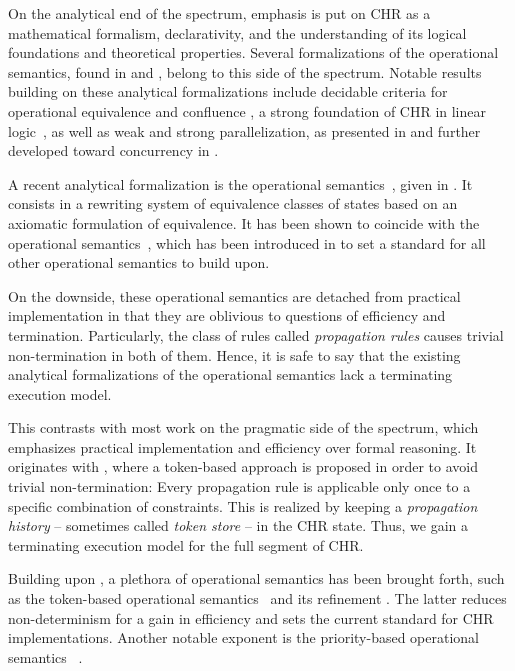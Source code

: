 \documentclass{tlp}
\begin{document}
On the analytical end of the spectrum, emphasis is put on CHR as a mathematical
formalism, declarativity, and the understanding of its logical foundations and
theoretical properties. Several formalizations of the operational semantics,
found in \cite{Fruhwirth1993,fruehwirth98} and \cite{fruehwirthabdennadher03},
belong to this side of the spectrum. Notable results building on these analytical
formalizations include decidable criteria for operational equivalence
\cite{abdennadherfruehwirth99} and confluence
\cite{abdennadherfruehwirthmeuss99}, a strong foundation of CHR in linear
logic~\cite{betzfruehwirth05}, as well as weak and strong parallelization, as
presented in \cite{fruehwirth05} and further developed toward concurrency in
\cite{Sulzmann2007,Sulzmann2008}.

A recent analytical formalization is the operational semantics~, given
in \cite{Raiser2009a}. It consists in a rewriting system of equivalence classes
of states based on an axiomatic formulation of equivalence. It has been shown to
coincide with the operational semantics~, which has been introduced
in \cite{fruehwirth09} to set a standard for all other operational semantics to
build upon.

On the downside, these operational semantics are detached from practical
implementation in that they are oblivious to questions of efficiency and
termination. Particularly, the class of rules called \emph{propagation rules}
causes trivial non-termination in both of them. Hence, it is safe to say that
the existing analytical formalizations of the operational semantics lack a 
terminating execution model.

This contrasts with most work on the pragmatic side of the spectrum, which
emphasizes practical implementation and efficiency over formal reasoning. It
originates with \cite{abdennadher97}, where a token-based approach is proposed in
order to avoid trivial non-termination: Every propagation rule is applicable only
once to a specific combination of constraints.  This is realized by keeping a
\emph{propagation history} -- sometimes called \emph{token store} -- in the CHR
state. Thus, we gain a terminating execution model for the full segment of CHR.

Building upon \cite{abdennadher97}, a plethora of operational semantics has been
brought forth, such as the token-based operational semantics~ and its
refinement  \cite{Duck2004}. The latter reduces non-determinism for a
gain in efficiency and sets the current standard for CHR implementations. Another
notable exponent is the priority-based operational semantics~
\cite{dekoninckschrijversdemoen07}.
\end{document}
